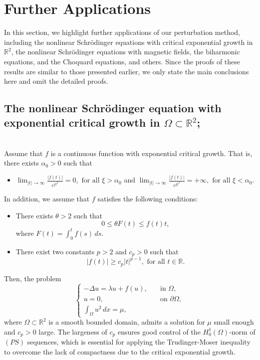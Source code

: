 \documentclass[11pt]{amsart}
\newcommand{\abs}[1]{\lvert#1\rvert}
\numberwithin{equation}{section}
\begin{document}
\section{Further Applications}\label{secfinalremarks}
In this section, we highlight further applications of our perturbation method, including the nonlinear Schr\"{o}dinger equations with critical exponential growth in $\mathbb{R}^{2}$, the nonlinear Schr\"{o}dinger equations with magnetic fields, the biharmonic equations, and the Choquard  equations, and others. Since the proofs of these results are similar to those presented earlier,  we only state the main conclusions here and omit the detailed proofs.
\subsection{The nonlinear Schr\"{o}dinger equation with exponential critical growth in \texorpdfstring{$\Omega\subset\mathbb{R}^2$}{Lg};} \mbox{}\\
Assume that $f$ is a continuous function with  exponential critical growth. That is,
there exists $\alpha_0>0$ such that
\begin{itemize}
	\item[$(f_1)$] $\displaystyle \lim_{\abs{t} \to \infty}\frac{\abs{f(t)}}{e^{\xi t^2}}=0, \,\,\text{for all}\,\, \xi >\alpha_0 $ \quad
	and \quad $\displaystyle \lim_{\abs{t} \to \infty}\frac{\abs{f(t)}}{e^{\xi t^2}}=+\infty, \,\,\text{for all}\,\,  \xi <\alpha_0. $
\end{itemize}
In addition, we assume that $f$ satisfies the following conditions:
\begin{itemize}
	\item[$(f_2)$] There exists $\theta>2$ such that
	$$
0\leq \theta F(t) \leq f(t)t,
	$$
	where $F(t)=\int_{0}^{t}f(s)\,ds$.
    \item[$(f_3)$] There exist two constants $p>2$ and $c_p>0$ such that
    $$
    \abs{f(t)} \geq c_p\abs{t}^{p-1},\,\,\text{for all}\,\, t\in \mathbb{R}.
    $$
\end{itemize}
Then, the problem
\begin{equation} \label{exponetial}
\left\{
\begin{array}{ll}
	-\Delta u = \lambda u + f(u), \quad & \text{in } \Omega, \\
	u = 0, & \text{on } \partial \Omega, \\
	\int_{\Omega} u^2\,dx = \mu,
\end{array}
\right.
\end{equation}
where $\Omega \subset \mathbb{R}^2$ is a smooth bounded domain, admits a solution for $\mu$ small enough and $c_p>0$ large.  The largeness of $c_p$ ensures good control of the $H_{0}^{1}(\Omega)$-norm of $(PS)$  sequences,  which is essential for applying the  Trudinger-Moser inequality to overcome the lack of compactness due to the critical exponential growth.
\end{document}

